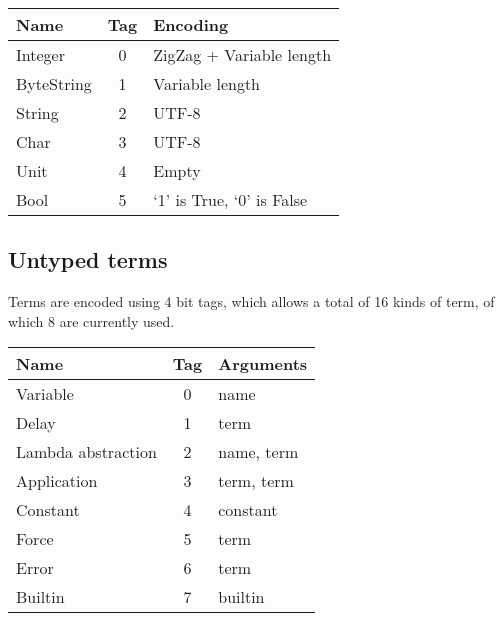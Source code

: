 \documentclass[a4paper]{article}
\newcommand\sep{4pt}
\newcommand{\Strut}{\rule[-2mm]{0mm}{6mm}}
\begin{document}
\begin{appendices}
\vspace{1cm}

\begin{minipage}{\linewidth}
\centering
\begin{tabular}{|l|c|l|}
  \hline
  \Strut
  \textrm{Name} & \textrm{Tag} & \textrm{Encoding} \\
  \hline
  Integer & 0 & ZigZag + Variable length \\[\sep]
  ByteString & 1 & Variable length \rule{0mm}{4mm} \\[\sep]
  String & 2 & UTF-8 \\[\sep]
  Char & 3 & UTF-8 \\[\sep]
  Unit & 4 & Empty \\[\sep]
  Bool & 5 & `1' is True, `0' is False \\[\sep]
  \hline
\end{tabular}
\label{fig:serialisation-constants}
\end{minipage}

\subsection{Untyped terms}

Terms are encoded using 4 bit tags, which allows a total of 16 kinds of term, of which 8 are
currently used.

\vspace{1cm}

\begin{minipage}{\linewidth}
\centering
\begin{tabular}{|l|c|l|}
  \hline
  \Strut
  \textrm{Name} & \textrm{Tag} & \textrm{Arguments} \\
  \hline
  Variable & 0 & name \rule{0mm}{4mm} \\[\sep]
  Delay & 1 & term \\[\sep]
  Lambda abstraction & 2 & name, term \\[\sep]
  Application & 3 & term, term \\[\sep]
  Constant & 4 & constant \\[\sep]
  Force & 5 & term \\[\sep]
  Error & 6 & term \\[\sep]
  Builtin & 7 & builtin \\[\sep]
  \hline
\end{tabular}
\label{fig:serialisation-terms}
\end{minipage}


\end{appendices}
\end{document}
